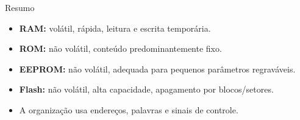 \begin{frame}[t]{Resumo}
  \begin{itemize}
    \item \textbf{RAM:} volátil, rápida, leitura e escrita temporária.
    \item \textbf{ROM:} não volátil, conteúdo predominantemente fixo.
    \item \textbf{EEPROM:} não volátil, adequada para pequenos parâmetros regraváveis.
    \item \textbf{Flash:} não volátil, alta capacidade, apagamento por blocos/setores.
    \item A organização usa endereços, palavras e sinais de controle.
  \end{itemize}
\end{frame}
